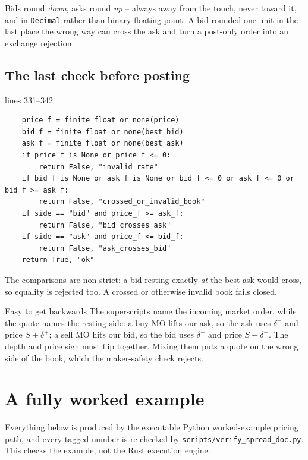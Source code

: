 \documentclass[11pt,a4paper]{article}
\newcommand{\code}[1]{\texttt{\small #1}}
\newcommand{\snip}[3]{%
  \par\addvspace{6pt}\noindent
  {\footnotesize\color{NavyLink}\texttt{\detokenize{#1}}\quad lines #2--#3}%
  \par\nobreak\vspace{1pt}}
\begin{document}
Bids round \emph{down}, asks round \emph{up} -- always away from the touch, never
toward it, and in \code{Decimal} rather than binary floating point. A bid rounded
one unit in the last place the wrong way can cross the ask and turn a post-only
order into an exchange rejection.

\subsection{The last check before posting}

\snip{scripts/mm_core.py}{331}{342}
\begin{lstlisting}
    price_f = finite_float_or_none(price)
    bid_f = finite_float_or_none(best_bid)
    ask_f = finite_float_or_none(best_ask)
    if price_f is None or price_f <= 0:
        return False, "invalid_rate"
    if bid_f is None or ask_f is None or bid_f <= 0 or ask_f <= 0 or bid_f >= ask_f:
        return False, "crossed_or_invalid_book"
    if side == "bid" and price_f >= ask_f:
        return False, "bid_crosses_ask"
    if side == "ask" and price_f <= bid_f:
        return False, "ask_crosses_bid"
    return True, "ok"
\end{lstlisting}

The comparisons are non-strict: a bid resting exactly \emph{at} the best ask
would cross, so equality is rejected too. A crossed or otherwise invalid book
fails closed.

\begin{trap}{Easy to get backwards}
The superscripts name the incoming market order, while the quote names the
resting side: a buy MO lifts our ask, so the ask uses $\delta^{+}$ and price
$S+\delta^{+}$; a sell MO hits our bid, so the bid uses $\delta^{-}$ and price
$S-\delta^{-}$. The depth and price sign must flip together. Mixing them puts a
quote on the wrong side of the book, which the maker-safety check rejects.
\end{trap}

\section{A fully worked example}
\label{sec:worked}

Everything below is produced by the executable Python worked-example pricing
path, and every tagged number is re-checked by
\code{scripts/verify\_spread\_doc.py}. This checks the example, not the Rust execution engine.
\end{document}

